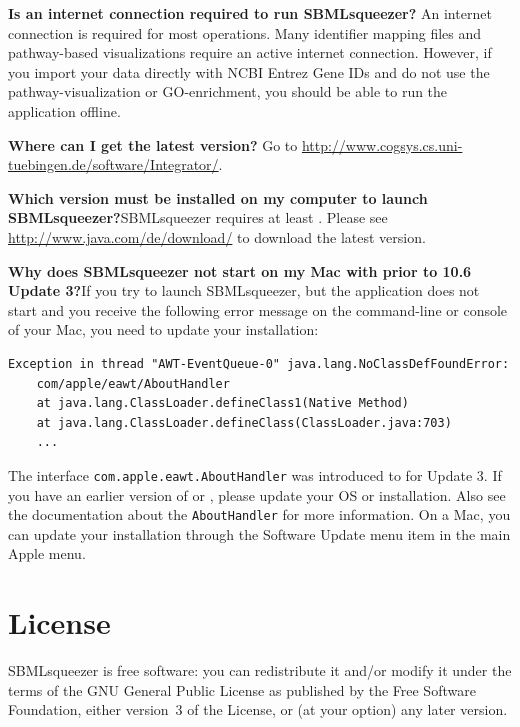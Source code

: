 \noindent \textbf{Is an internet connection required to run SBMLsqueezer?}\newline
An internet connection is required for most operations. Many identifier mapping
files and pathway-based visualizations require an active internet connection.
However, if you import your data directly with NCBI Entrez Gene IDs and do not
use the pathway-visualization or GO-enrichment, you should be able to run the
application offline.\newline

\noindent \textbf{Where can I get the latest version?}\newline
Go to \url{http://www.cogsys.cs.uni-tuebingen.de/software/Integrator/}.\newline

\noindent \textbf{Which \Java version must be installed on my computer to launch
SBMLsqueezer?}\newline SBMLsqueezer requires at least . Please see
\url{http://www.java.com/de/download/} to download the latest \Java version.

\noindent 
\textbf{Why does SBMLsqueezer not start on my Mac with \MacOSX prior to 10.6 Update 3?}\newline If you try to launch SBMLsqueezer, but the application does
not start and you receive the following error message on the command-line or
\Java console of your Mac, you need to update your \Java installation:
\begin{verbatim}
Exception in thread "AWT-EventQueue-0" java.lang.NoClassDefFoundError:
    com/apple/eawt/AboutHandler
    at java.lang.ClassLoader.defineClass1(Native Method)
    at java.lang.ClassLoader.defineClass(ClassLoader.java:703)
    ...
\end{verbatim}
The interface \texttt{com.apple.eawt.AboutHandler} was introduced to \Java for
 Update 3. If you have an earlier version of \MacOSX or \Java,
please update your OS or \Java installation. Also see the \MacOSX documentation
about the \texttt{AboutHandler} for more information. On a Mac, you can update
your \Java installation through the Software Update menu item in the main Apple
menu.

\chapter{License}

SBMLsqueezer is free software: you can redistribute it and/or modify
it under the terms of the GNU General Public License as published by
the Free Software Foundation, either version~3 of the License, or
(at your option) any later version.

